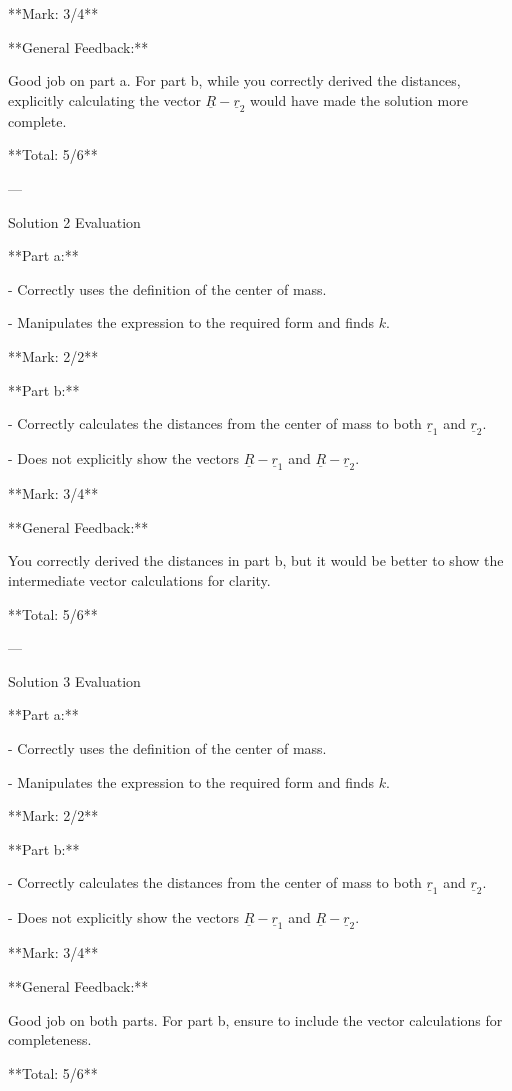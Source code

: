 \documentclass[a4paper,11pt]{article}
\begin{document}
**Mark: 3/4**

**General Feedback:**

Good job on part a. For part b, while you correctly derived the distances, explicitly calculating the vector \( \underline{R} - \underline{r}_2 \) would have made the solution more complete.

**Total: 5/6**

---

Solution 2 Evaluation

**Part a:**

- Correctly uses the definition of the center of mass.

- Manipulates the expression to the required form and finds \( k \).

**Mark: 2/2**

**Part b:**

- Correctly calculates the distances from the center of mass to both \( \underline{r}_1 \) and \( \underline{r}_2 \).

- Does not explicitly show the vectors \( \underline{R} - \underline{r}_1 \) and \( \underline{R} - \underline{r}_2 \).

**Mark: 3/4**

**General Feedback:**

You correctly derived the distances in part b, but it would be better to show the intermediate vector calculations for clarity.

**Total: 5/6**

---

Solution 3 Evaluation

**Part a:**

- Correctly uses the definition of the center of mass.

- Manipulates the expression to the required form and finds \( k \).

**Mark: 2/2**

**Part b:**

- Correctly calculates the distances from the center of mass to both \( \underline{r}_1 \) and \( \underline{r}_2 \).

- Does not explicitly show the vectors \( \underline{R} - \underline{r}_1 \) and \( \underline{R} - \underline{r}_2 \).

**Mark: 3/4**

**General Feedback:**

Good job on both parts. For part b, ensure to include the vector calculations for completeness.

**Total: 5/6**
\end{document}
